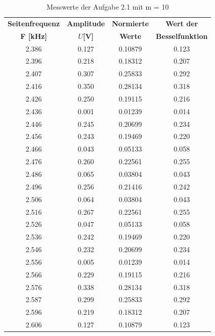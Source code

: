 \documentclass[12pt]{scrartcl}
\begin{document}
  \begin{table}[H] 
     \centering
\begin{tabular}{|c|c|c|c|} 
           \hline \textbf{Seitenfrequenz} & \textbf{Amplitude} & \textbf{Normierte }& \textbf{Wert der } \\ 
           \textbf{ F [kHz]}    & \textbf{$U$[V]}  & \textbf{Werte}  &  \textbf{Besselfunktion}   \\ \hline
2.386   & 0.127 & 0.10879 & 0.123 \\ \hline
2.396   & 0.218 & 0.18312 & 0.207 \\ \hline
2.407   & 0.307 & 0.25833 & 0.292 \\ \hline
2.416   & 0.350 & 0.28134 & 0.318 \\ \hline   
2.426   & 0.250 & 0.19115 & 0.216 \\ \hline
2.436   & 0.001 & 0.01239 & 0.014 \\ \hline
2.446   & 0.245 & 0.20699 & 0.234 \\ \hline
2.456   & 0.243 & 0.19469 & 0.220 \\ \hline
2.466   & 0.043 & 0.05133 & 0.058 \\ \hline
2.476   & 0.260 & 0.22561 & 0.255 \\ \hline
2.486   & 0.065 & 0.03804 & 0.043 \\ \hline
2.496   & 0.256 & 0.21416 & 0.242 \\ \hline
2.506   & 0.064 & 0.03804 & 0.043 \\ \hline
2.516   & 0.267 & 0.22561 & 0.255 \\ \hline   
2.526   & 0.047 & 0.05133 & 0.058 \\ \hline
2.536   & 0.242 & 0.19469 & 0.220 \\ \hline
2.546   & 0.232 & 0.20699 & 0.234 \\ \hline
2.556   & 0.005 & 0.01239 & 0.014 \\ \hline
2.566   & 0.229 & 0.19115 & 0.216 \\ \hline
2.576   & 0.338 & 0.28134 & 0.318 \\ \hline
2.587   & 0.299 & 0.25833 & 0.292 \\ \hline
2.596   & 0.219 & 0.18312 & 0.207 \\ \hline
2.606   & 0.127 & 0.10879 & 0.123 \\ \hline
     \end{tabular}
     \caption{Messwerte der Aufgabe 2.1 mit m = 10 } \label{tab:Aufgabe2.1_m=10}
 \end{table}
\newpage
\end{document}
